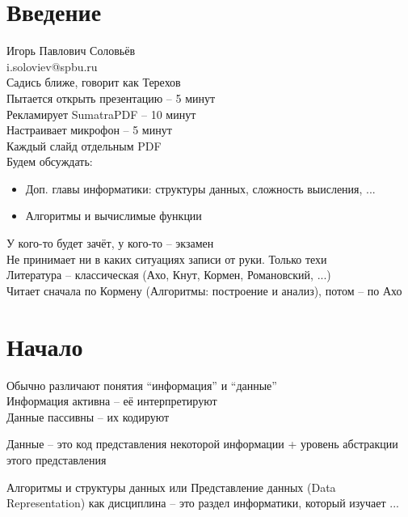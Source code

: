 \section{Введение}

Игорь Павлович Соловьёв \\
i.soloviev@spbu.ru \\
Садись ближе, говорит как Терехов \\
Пытается открыть презентацию -- 5 минут \\
Рекламирует SumatraPDF -- 10 минут \\
Настраивает микрофон -- 5 минут \\
Каждый слайд отдельным PDF \\
Будем обсуждать:
\begin{itemize}
	\item Доп. главы информатики: структуры данных, сложность выисления, ...
	\item Алгоритмы и вычислимые функции
\end{itemize}
У кого-то будет зачёт, у кого-то -- экзамен \\
Не принимает ни в каких ситуациях записи от руки. Только техи \\
Литература -- классическая (Ахо, Кнут, Кормен, Романовский, ...) \\
Читает сначала по Кормену (Алгоритмы: построение и анализ), потом -- по Ахо

\section{Начало}

Обычно различают понятия ``информация'' и ``данные'' \\
Информация активна -- её интерпретируют \\
Данные пассивны -- их кодируют

\begin{definition}
	Данные -- это код представления некоторой информации + уровень абстракции этого представления
\end{definition}

Алгоритмы и структуры данных или Представление данных (Data Representation) как дисциплина -- это раздел информатики, который изучает ...
